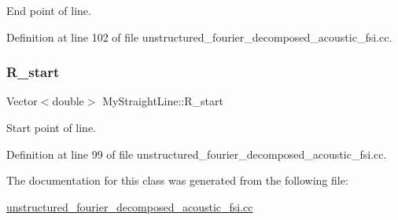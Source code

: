 End point of line. 



Definition at line 102 of file unstructured\+\_\+fourier\+\_\+decomposed\+\_\+acoustic\+\_\+fsi.\+cc.

\mbox{\label{classMyStraightLine_a0f66636dd5d1e7ff6ec93acf90879f0c}} 
\subsubsection{\texorpdfstring{R\+\_\+start}{R\_start}}
{\footnotesize\ttfamily Vector$<$double$>$ My\+Straight\+Line\+::\+R\+\_\+start\hspace{0.3cm}{\ttfamily [private]}}



Start point of line. 



Definition at line 99 of file unstructured\+\_\+fourier\+\_\+decomposed\+\_\+acoustic\+\_\+fsi.\+cc.



The documentation for this class was generated from the following file\+:\begin{DoxyCompactItemize}
\item 
\hyperlink{unstructured__fourier__decomposed__acoustic__fsi_8cc}{unstructured\+\_\+fourier\+\_\+decomposed\+\_\+acoustic\+\_\+fsi.\+cc}\end{DoxyCompactItemize}
